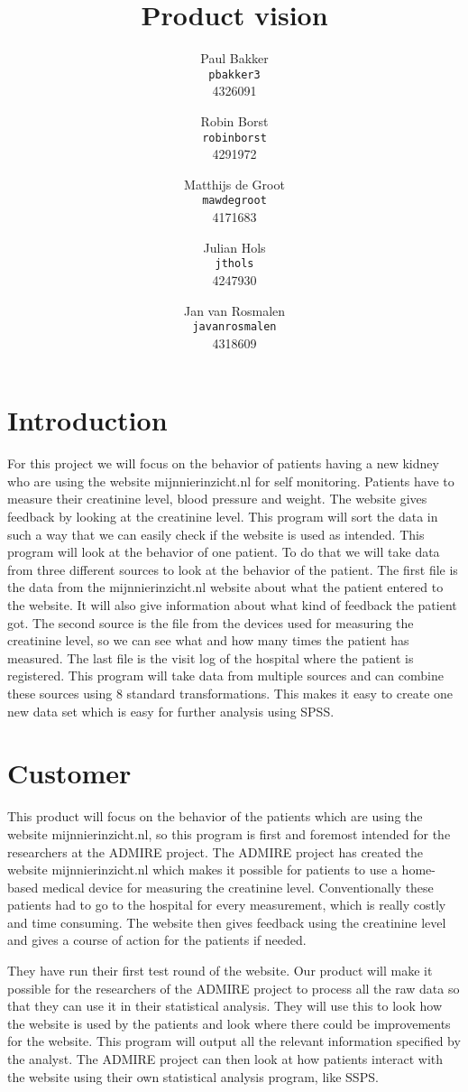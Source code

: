 \documentclass[11pt,twoside,a4paper]{article}
\title{Product vision}
\author{
	Paul Bakker \\ \texttt{pbakker3} \\ 4326091 \and
    Robin Borst \\ \texttt{robinborst} \\ 4291972 \and
    Matthijs de Groot \\ \texttt{mawdegroot} \\ 4171683 \and
    Julian Hols \\ \texttt{jthols} \\ 4247930 \and
    Jan van Rosmalen \\ \texttt{javanrosmalen} \\ 4318609
}
\begin{document}
\maketitle
\newpage
\tableofcontents
\newpage
\section{Introduction}
For this project we will focus on the behavior of patients having a new kidney who are using the website mijnnierinzicht.nl for self monitoring. Patients have to measure their creatinine level, blood pressure and weight. The website gives feedback by looking at the creatinine level. This program will sort the data in such a way that we can easily check if the website is used as intended. This program will look at the behavior of one patient. To do that we will take data from three different sources to look at the behavior of the patient. The first file is the data from the mijnnierinzicht.nl website about what the patient entered to the website. It will also give information about what kind of feedback the patient got.
The second source is the file from the devices used for measuring the creatinine level, so we can see what and how many times the patient has measured. The last file is the visit log of the hospital where the patient is registered. 
This program will take data from multiple sources and can combine these sources using 8 standard transformations. This makes it easy to create one new data set which is easy for further analysis using SPSS.



\section{Customer}

This product will focus on the behavior of the patients which are using the website mijnnierinzicht.nl, so this program is first and foremost intended for the researchers at the ADMIRE project. The ADMIRE project has created the website mijnnierinzicht.nl which makes it possible for patients to use a home-based medical device for measuring the creatinine level. Conventionally these patients had to go to the hospital for every measurement, which is really costly and time consuming. The website then gives feedback using the creatinine level and gives a course of action for the patients if needed. 

They have run their first test round of the website.
Our product will make it possible for the researchers of the ADMIRE project to process all the raw data so that they can use it in their statistical analysis. They will use this to look how the website is used by the patients and look where there could be improvements for the website. This program will output all the relevant information specified by the analyst. The ADMIRE project can then look at how patients interact with the website using their own statistical analysis program, like SSPS. 
\end{document}

